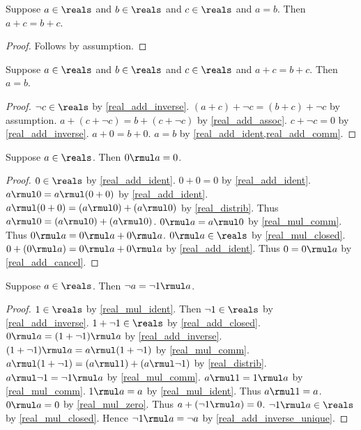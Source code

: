 \begin{theorem}\label{real_add_eq_subst}
    Suppose $a\in\reals$ and $b\in\reals$ and $c\in\reals$ and $a = b$.
    Then $a + c = b + c$.
\end{theorem}
\begin{proof}
    Follows by assumption.
\end{proof}

\begin{theorem}\label{real_add_cancel}
    Suppose $a\in\reals$ and $b\in\reals$ and $c\in\reals$ and $a + c = b + c$.
    Then $a = b$.
\end{theorem}
\begin{proof}
    $\neg{c}\in\reals$ by \cref{real_add_inverse}.
    $(a + c) + \neg{c} = (b + c) + \neg{c}$ by assumption.
    $a + (c + \neg{c}) = b + (c + \neg{c})$ by \cref{real_add_assoc}.
    $c + \neg{c} = 0$ by \cref{real_add_inverse}.
    $a + 0 = b + 0$.
    $a = b$ by \cref{real_add_ident,real_add_comm}.
\end{proof}

\begin{theorem}\label{real_mul_zero}
    Suppose $a\in\reals$.
    Then $0 \rmul a = 0$.
\end{theorem}
\begin{proof}
    $0\in\reals$ by \cref{real_add_ident}.
    $0 + 0 = 0$ by \cref{real_add_ident}.
    $a \rmul 0 = a \rmul (0 + 0)$ by \cref{real_add_ident}.
    $a \rmul (0 + 0) = (a \rmul 0) + (a \rmul 0)$ by \cref{real_distrib}.
    Thus $a \rmul 0 = (a \rmul 0) + (a \rmul 0)$.
    $0 \rmul a = a \rmul 0$ by \cref{real_mul_comm}.
    Thus $0 \rmul a = 0 \rmul a + 0 \rmul a$.
    $0 \rmul a\in\reals$ by \cref{real_mul_closed}.
    $0 + (0 \rmul a) = 0 \rmul a + 0 \rmul a$ by \cref{real_add_ident}.
    Thus $0 = 0 \rmul a$ by \cref{real_add_cancel}.
\end{proof}

\begin{theorem}\label{real_neg_as_mul}
    Suppose $a\in\reals$.
    Then $\neg{a} = \neg{1} \rmul a$.
\end{theorem}
\begin{proof}
    $1\in\reals$ by \cref{real_mul_ident}.
    Then $\neg{1}\in\reals$ by \cref{real_add_inverse}.
    $1 + \neg{1}\in\reals$ by \cref{real_add_closed}.
    $0 \rmul a = (1 + \neg{1}) \rmul a$ by \cref{real_add_inverse}.
    $(1 + \neg{1}) \rmul a = a \rmul (1 + \neg{1})$ by \cref{real_mul_comm}.
    $a \rmul (1 + \neg{1}) = (a \rmul 1) + (a \rmul \neg{1})$ by \cref{real_distrib}.
    $a \rmul \neg{1} = \neg{1} \rmul a$ by \cref{real_mul_comm}.
    $a \rmul 1 = 1 \rmul a$ by \cref{real_mul_comm}.
    $1 \rmul a = a$ by \cref{real_mul_ident}.
    Thus $a \rmul 1 = a$.
    $0 \rmul a = 0$ by \cref{real_mul_zero}.
    Thus $a + (\neg{1} \rmul a) = 0$.
    $\neg{1} \rmul a\in\reals$ by \cref{real_mul_closed}.
    Hence $\neg{1} \rmul a = \neg{a}$ by \cref{real_add_inverse_unique}.
\end{proof}

